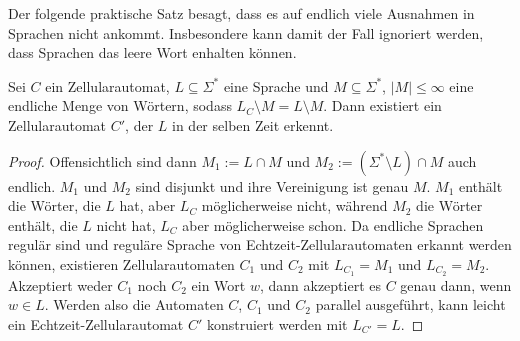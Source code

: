 Der folgende praktische Satz besagt, dass es auf endlich viele Ausnahmen in Sprachen nicht ankommt.
Insbesondere kann damit der Fall ignoriert werden, dass Sprachen das leere Wort enhalten können.
\begin{satz}
    \label{endlichVieleAusnahmen}
    Sei $C$ ein Zellularautomat,
    $L \subseteq \Sigma^*$ eine Sprache und $M \subseteq \Sigma^*$, $|M| \leq \infty$  eine endliche Menge von Wörtern, sodass $L_C \setminus M = L \setminus M$.
    Dann existiert ein Zellularautomat $C'$, der $L$ in der selben Zeit erkennt.
\end{satz}
\begin{proof}
    Offensichtlich sind dann $M_1 := L \cap M$ und $M_2 := (\Sigma^* \setminus L) \cap M$ auch endlich.
    $M_1$ und $M_2$ sind disjunkt und ihre Vereinigung ist genau $M$.
    $M_1$ enthält die Wörter, die $L$ hat, aber $L_C$ möglicherweise nicht, während $M_2$ die Wörter enthält, die $L$ nicht hat, $L_C$ aber möglicherweise schon.
    Da endliche Sprachen regulär sind und reguläre Sprache von Echtzeit-Zellularautomaten erkannt werden können,
    existieren Zellularautomaten $C_1$ und $C_2$ mit $L_{C_1} = M_1$ und $L_{C_2} = M_2$.
    Akzeptiert weder $C_1$ noch $C_2$ ein Wort $w$, dann akzeptiert es $C$ genau dann, wenn $w \in L$.
    Werden also die Automaten $C$, $C_1$ und $C_2$ parallel ausgeführt, kann leicht ein Echtzeit-Zellularautomat $C'$ konstruiert werden mit $L_{C'} = L$.
\end{proof}
